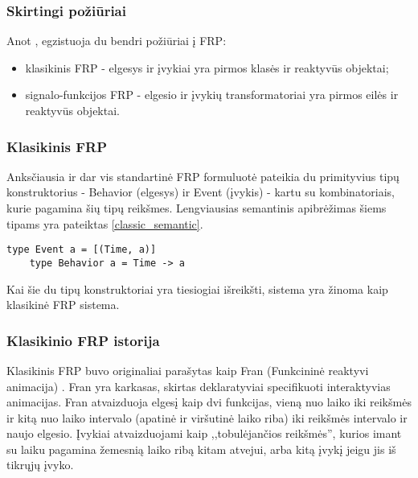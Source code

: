 

\subsubsection{Skirtingi požiūriai}

Anot \cite{Survey}, egzistuoja du bendri požiūriai į FRP:

\begin{itemize}

	\item klasikinis FRP - elgesys ir įvykiai yra pirmos klasės ir reaktyvūs objektai;

	\item signalo-funkcijos FRP - elgesio ir įvykių transformatoriai yra pirmos eilės ir reaktyvūs objektai.

\end{itemize}

\subsubsection{Klasikinis FRP}

Anksčiausia ir dar vis standartinė FRP formuluotė \cite{ElliottHudak97:Fran} pateikia du primityvius tipų konstruktorius - Behavior (elgesys) ir Event (įvykis) - kartu su kombinatoriais, kurie pagamina šių tipų reikšmes. Lengviausias semantinis apibrėžimas šiems tipams yra pateiktas \ref{classic_semantic}.

\begin{lstlisting}[caption=- klasikinio FRP semantiniai tipai, label=classic_semantic]
	type Event a = [(Time, a)]
	type Behavior a = Time -> a
\end{lstlisting} 

Kai šie du tipų konstruktoriai yra tiesiogiai išreikšti, sistema yra žinoma kaip klasikinė FRP sistema.

\subsubsection{Klasikinio FRP istorija}

Klasikinis FRP buvo originaliai parašytas kaip Fran (Funkcininė reaktyvi animacija) \cite{ElliottHudak97:Fran}. Fran yra karkasas, skirtas deklaratyviai specifikuoti interaktyvias animacijas. Fran atvaizduoja elgesį kaip dvi funkcijas, vieną nuo laiko iki reikšmės ir kitą nuo laiko intervalo (apatinė ir viršutinė laiko riba) iki reikšmės intervalo ir naujo elgesio. Įvykiai atvaizduojami kaip ,,tobulėjančios reikšmės'', kurios imant su laiku pagamina žemesnią laiko ribą kitam atvejui, arba kitą įvykį jeigu jis iš tikrųjų įvyko.

